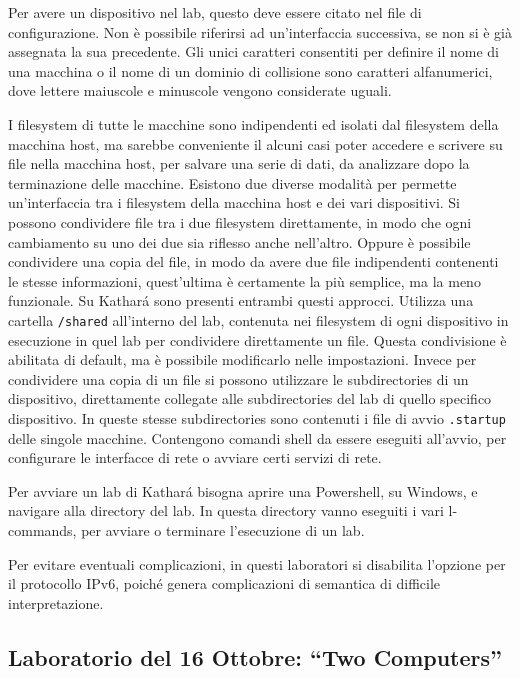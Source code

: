 \documentclass{article}
\numberwithin{equation}{subsection}
\begin{document}
Per avere un dispositivo nel lab, questo deve essere citato nel file di configurazione. Non è possibile riferirsi ad un'interfaccia successiva, se non si è già assegnata la sua precedente. Gli unici caratteri 
consentiti per definire il nome di una macchina o il nome di un dominio di collisione sono caratteri alfanumerici, dove lettere maiuscole e minuscole vengono considerate uguali. 

I filesystem di tutte le macchine sono indipendenti ed isolati dal filesystem della macchina host, ma sarebbe conveniente il alcuni casi poter accedere e scrivere su file nella macchina host, per salvare una 
serie di dati, da analizzare dopo la terminazione delle macchine. 
Esistono due diverse modalità per permette un'interfaccia tra i filesystem della macchina host e dei vari dispositivi. Si possono condividere file tra i due filesystem direttamente, in modo che ogni cambiamento 
su uno dei due sia riflesso anche nell'altro. Oppure è possibile condividere una copia del file, in modo da avere due file indipendenti contenenti le stesse informazioni, quest'ultima è certamente la più 
semplice, ma la meno funzionale. 
Su Kathar\'{a} sono presenti entrambi questi approcci. Utilizza una cartella \verb|/shared| all'interno del lab, contenuta nei filesystem di ogni dispositivo in esecuzione in quel lab per condividere direttamente 
un file. Questa condivisione è abilitata di default, ma è possibile modificarlo nelle impostazioni. Invece per condividere una copia di un file si possono utilizzare le subdirectories di un dispositivo, direttamente 
collegate alle subdirectories del lab di quello specifico dispositivo. 
In queste stesse subdirectories sono contenuti i file di avvio \verb|.startup| delle singole macchine. Contengono comandi shell da essere eseguiti all'avvio, per configurare le interfacce di rete o avviare 
certi servizi di rete. 

Per avviare un lab di Kathar\'{a} bisogna aprire una Powershell, su Windows, e navigare alla directory del lab. In questa directory vanno eseguiti i vari l-commands, per avviare o terminare l'esecuzione di un lab. 

Per evitare eventuali complicazioni, in questi laboratori si disabilita l'opzione per il protocollo IPv6, poiché genera complicazioni di semantica di difficile interpretazione. 

\subsection{Laboratorio del 16 Ottobre: ``Two Computers''}
\end{document}

